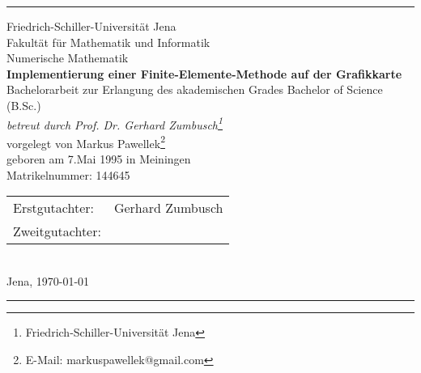 \documentclass[crop=false,9pt]{standalone}
\begin{document}
  \newcommand{\vrulefill}{\par\leaders\hbox{$\cdot$}\vfill}

  \begin{titlepage}
    \thispagestyle{empty}
    \noindent

    \begin{minipage}{\textwidth}
      \rule{1.5pt}{0.3\textheight}%

      \vspace{5mm}
      \noindent
      {\Large Friedrich-Schiller-Universität Jena \\ Fakultät für Mathematik und Informatik \\ Numerische Mathematik \\[2\baselineskip]}
      {\LARGE\bfseries Implementierung einer Finite-Elemente-Methode auf der Grafikkarte}\\[2\baselineskip]
      {\large Bachelorarbeit zur Erlangung des akademischen Grades Bachelor of Science (B.Sc.)\\}
      {\large \textit{betreut durch Prof. Dr. Gerhard Zumbusch\footnote{Friedrich-Schiller-Universität Jena}}}\\[4\baselineskip]
      {\Large vorgelegt von Markus Pawellek}\footnote{E-Mail: markuspawellek@gmail.com} \\[\baselineskip]
      {\large geboren am 7.Mai 1995 in Meiningen}\\
      {\large Matrikelnummer: 144645}

      \vspace{0.1\textheight} %
      \noindent
      \begin{tabular}{ll}
        \Large Erstgutachter: & \Large Gerhard Zumbusch \\
        \Large Zweitgutachter: & \Large
      \end{tabular}
      \\[\baselineskip] %
      \hspace{\textwidth} Jena, \today
      \vspace{5mm} \\
      \rule{1.5pt}{0.15\textheight}
    \end{minipage}

    \setcounter{page}{1}
  \end{titlepage}
\end{document}
